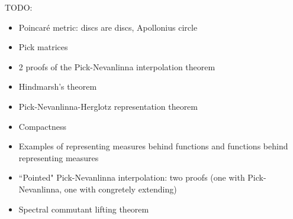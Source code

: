 \begin{comment}
Similarly, for any sequence of say $n$ points in the unit disc we may form the matrix
\[
	\begin{bmatrix}
		\frac{1 - |\psi(z_{1})|^{2}}{1 - |z_{1}|^{2}} & \frac{1 - \overline{\psi(z_{1})} \psi(z_{2})}{1 - \overline{z_{1}} z_{2}} & \cdots & \frac{1 - \overline{\psi(z_{1})} \psi(z_{n})}{1 - \overline{z_{1}} z_{n}} \\
		\frac{1 - \overline{\psi(z_{2})} \psi(z_{1})}{1 - \overline{z_{2}} z_{1}} & \frac{1 - |\psi(z_{2})|^{2}}{1 - |z_{2}|^{2}} & \cdots & \frac{1 - \overline{\psi(z_{2})} \psi(z_{n})}{1 - \overline{z_{2}} z_{n}} \\
		\vdots & \vdots & \ddots & \vdots \\
		\frac{1 - \overline{\psi(z_{n})} \psi(z_{1})}{1 - \overline{z_{n}} z_{1}} & \frac{1 - \overline{\psi(z_{n})} \psi(z_{2})}{1 - \overline{z_{n}} z_{2}} & \cdots &  \frac{1 - |\psi(z_{n})|^{2}}{1 - |z_{n}|^{2}}
	\end{bmatrix}
\]

\end{comment}

TODO:
\begin{itemize}
	\item Poincaré metric: discs are discs, Apollonius circle
	\item Pick matrices
	\item 2 proofs of the Pick-Nevanlinna interpolation theorem
	\item Hindmarsh's theorem
	\item Pick-Nevanlinna-Herglotz representation theorem
	\item Compactness
	\item Examples of representing measures behind functions and functions behind representing measures
	\item ``Pointed" Pick-Nevanlinna interpolation: two proofs (one with Pick-Nevanlinna, one with congretely extending)
	\item Spectral commutant lifting theorem
\end{itemize}


